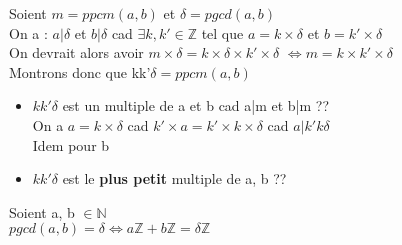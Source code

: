 \begin{myproof}[Demonstration:]
Soient $m=ppcm(a,b)$ et $\delta = pgcd(a,b)$ \\
On a : $a|\delta$ et $b|\delta$ cad $\exists k, k' \in \mathbb{Z}$ tel
que $a=k \times \delta$ et $b=k' \times \delta $\\
On devrait alors avoir $m \times \delta = k \times \delta \times k' \times \delta$
$\Leftrightarrow m=k\times k'\times \delta$\\
Montrons donc que kk'$\delta = ppcm(a,b)$
\begin{itemize}[label=, font=\color{black}]
	\item $k k' \delta$ est un multiple de a et b cad a|m et b|m  ??\\
	On a $a = k \times \delta$ cad $k' \times a = k' \times k \times \delta$ cad $a | k'k\delta$ \\
	Idem pour b

	\item $kk'\delta$ est le \textbf{plus petit} multiple de a, b ??	
\end{itemize}
\end{myproof}

\begin{maprop}
Soient a, b $\in \mathbb{N}$ \\
$pgcd(a,b) = \delta \Leftrightarrow a\mathbb{Z}+b\mathbb{Z}=\delta\mathbb{Z}$
\end{maprop}

